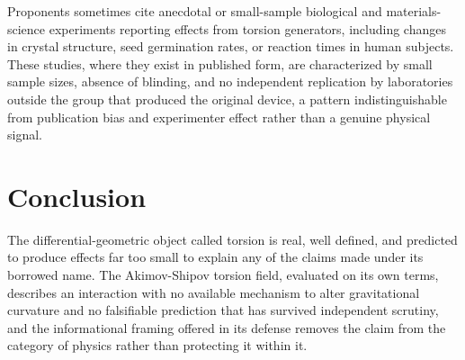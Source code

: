 \documentclass[11pt]{article}
\begin{document}
Proponents sometimes cite anecdotal or small-sample biological and materials-science experiments reporting effects from torsion generators, including changes in crystal structure, seed germination rates, or reaction times in human subjects. These studies, where they exist in published form, are characterized by small sample sizes, absence of blinding, and no independent replication by laboratories outside the group that produced the original device, a pattern indistinguishable from publication bias and experimenter effect rather than a genuine physical signal.

\section{Conclusion}

The differential-geometric object called torsion is real, well defined, and predicted to produce effects far too small to explain any of the claims made under its borrowed name. The Akimov-Shipov torsion field, evaluated on its own terms, describes an interaction with no available mechanism to alter gravitational curvature and no falsifiable prediction that has survived independent scrutiny, and the informational framing offered in its defense removes the claim from the category of physics rather than protecting it within it.
\end{document}
